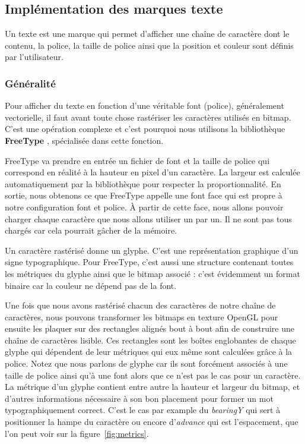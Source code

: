 \documentclass[12pt]{article}
\begin{document}
\subsection{Implémentation des marques texte}

Un texte est une marque qui permet d'afficher une chaîne de caractère dont le contenu, la police, la taille de police ainsi que la position et couleur sont définis par l'utilisateur.

\subsubsection{Généralité}

Pour afficher du texte en fonction d'une véritable font (police), généralement vectorielle, il faut avant toute chose rastériser les caractères utilisés en bitmap.
C'est une opération complexe et c'est pourquoi nous utilisons la bibliothèque \textbf{FreeType} \cite{freetype-rs}, spécialisée dans cette fonction.

FreeType va prendre en entrée un fichier de font et la taille de police qui correspond en réalité à la hauteur en pixel d'un caractère. La largeur est calculée automatiquement
par la bibliothèque pour respecter la proportionnalité. En sortie, nous obtenons ce que FreeType appelle une \og font face\fg{} qui est propre à notre configuration font et police.
À partir de cette face, nous allons pouvoir charger chaque caractère que nous allons utiliser un par un. Il ne sont pas tous chargés car cela pourrait gâcher de la mémoire.

Un caractère rastérisé donne un glyphe. C'est une représentation graphique d'un signe typographique. Pour FreeType, c'est aussi une structure contenant toutes les métriques
du glyphe ainsi que le bitmap associé : c'est évidemment un format binaire car la couleur ne dépend pas de la font.

Une fois que nous avons rastérisé chacun des caractères de notre chaîne de caractères, nous pouvons transformer les bitmaps en texture OpenGL pour ensuite les plaquer
sur des rectangles alignés bout à bout afin de construire une chaîne de caractères lisible. Ces rectangles sont les boîtes englobantes de chaque glyphe qui dépendent
de leur métriques qui eux même sont calculées grâce à la police.
Notez que nous parlons de glyphe car ils sont forcément associés à une taille de police ainsi qu'à une font alors que ce n'est pas le cas pour un caractère.
La métrique d'un glyphe \cite{metrics} contient entre autre la hauteur et largeur du bitmap, et d'autres informations nécessaire à son bon placement pour former un mot typographiquement correct.
C'est le cas par example du \textit{bearingY} qui sert à positionner la hampe du caractère ou encore d'\textit{advance} qui est l'espacement, que l'on peut voir sur la figure~\ref{fig:metrics}.
\end{document}
